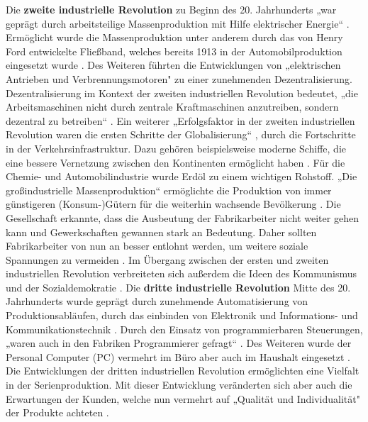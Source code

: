 \newline\newline
\noindent Die \textbf{zweite industrielle Revolution} zu Beginn des 20. Jahrhunderts „war geprägt durch arbeitsteilige Massenproduktion mit Hilfe elektrischer Energie“ \cite[S.5]{15}. Ermöglicht wurde die Massenproduktion unter anderem durch das von Henry Ford entwickelte Fließband, welches bereits 1913 in der Automobilproduktion eingesetzt wurde \cite{10}. Des Weiteren führten die Entwicklungen von „elektrischen Antrieben und Verbrennungsmotoren" \cite[S.6]{15} zu einer zunehmenden Dezentralisierung. Dezentralisierung im Kontext der zweiten industriellen Revolution bedeutet, „die Arbeitsmaschinen nicht durch zentrale Kraftmaschinen anzutreiben, sondern dezentral zu betreiben“ \cite[S.6]{15}. Ein weiterer „Erfolgsfaktor in der zweiten industriellen Revolution waren die ersten Schritte der Globalisierung“ \cite{9}, durch die Fortschritte in der Verkehrsinfrastruktur. Dazu gehören beispielsweise moderne Schiffe, die eine bessere Vernetzung zwischen den Kontinenten ermöglicht haben \cite{9}. Für die Chemie- und Automobilindustrie wurde Erdöl zu einem wichtigen Rohstoff. „Die großindustrielle Massenproduktion“ \cite[S.6]{15} ermöglichte die Produktion von immer günstigeren (Konsum-)Gütern für die weiterhin wachsende Bevölkerung \cite[S.6]{15}. Die Gesellschaft erkannte, dass die Ausbeutung der Fabrikarbeiter nicht weiter gehen kann und Gewerkschaften gewannen stark an Bedeutung. Daher sollten Fabrikarbeiter von nun an besser entlohnt werden, um weitere soziale Spannungen zu vermeiden \cite[S.6]{15}. Im Übergang zwischen der ersten und zweiten industriellen Revolution verbreiteten sich außerdem die Ideen des Kommunismus und der Sozialdemokratie \cite[S.6]{15}.
\newline\newline
Die \textbf{dritte industrielle Revolution} Mitte des 20. Jahrhunderts wurde geprägt durch zunehmende Automatisierung von Produktionsabläufen, durch das einbinden von Elektronik und Informations- und Kommunikationstechnik \cite[S.7]{15}. Durch den Einsatz von programmierbaren Steuerungen, „waren auch in den Fabriken Programmierer gefragt“ \cite{10}. Des Weiteren wurde der Personal Computer (PC) vermehrt im Büro aber auch im Haushalt eingesetzt \cite{9}. Die Entwicklungen der dritten industriellen Revolution ermöglichten eine Vielfalt in der Serienproduktion. Mit dieser Entwicklung veränderten sich aber auch die Erwartungen der Kunden, welche nun vermehrt auf „Qualität und Individualität" \cite[S.7]{15} der Produkte achteten \cite[S.7]{15}.
